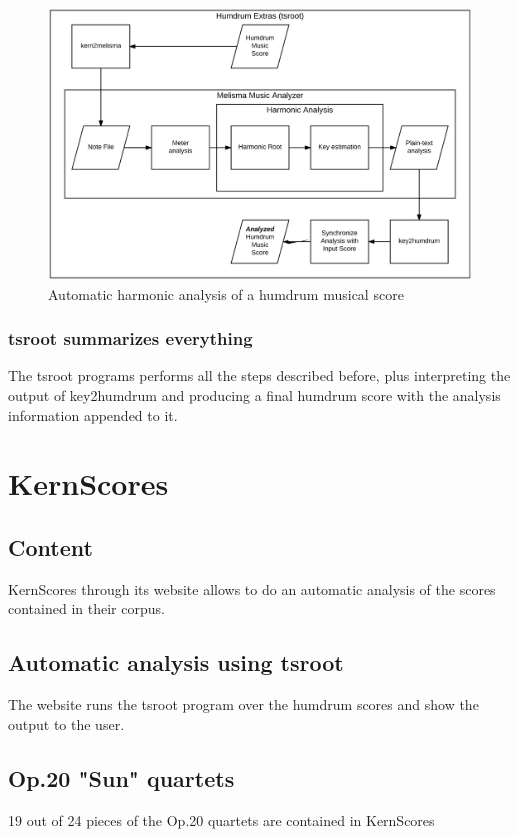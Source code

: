     \begin{figure}[ht]
      \centering
        \includegraphics[width=1.0\textwidth]{04-methodology/figures/3}
      \caption{Automatic harmonic analysis of a humdrum musical score}
      \label{fig:software_stack3}
    \end{figure}

  \subsubsection{tsroot summarizes everything}
    The tsroot programs performs all the steps described before, plus interpreting the output of key2humdrum and producing a final humdrum score with the analysis information appended to it.
\section{KernScores}
  \subsection{Content}
  KernScores through its website allows to do an automatic analysis of the scores contained in their corpus.
  \subsection{Automatic analysis using tsroot}
  The website runs the tsroot program over the humdrum scores and show the output to the user.
  \subsection{Op.20 "Sun" quartets}
    19 out of 24 pieces of the Op.20 quartets are contained in KernScores
